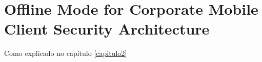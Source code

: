 \chapter{Offline Mode for Corporate Mobile Client Security Architecture}
\label{chapter4}

Como explicado no capítulo \ref{capitulo2}